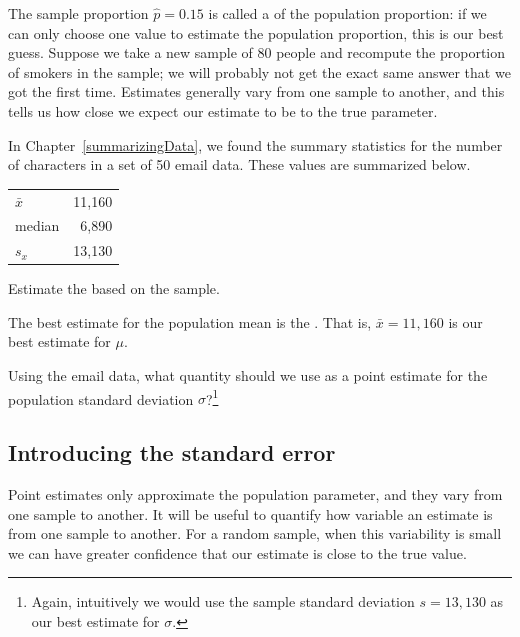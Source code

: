 The sample proportion $\hat{p} = 0.15$ is called a  of the population proportion: if we can only choose one value to estimate the population proportion, this is our best guess. Suppose we take a new sample of 80 people and recompute the proportion of smokers in the sample; we will probably not get the exact same answer that we got the first time. Estimates generally vary from one sample to another, and this  tells us how close we expect our estimate to be to the true parameter.

\begin{example}{
In Chapter~\ref{summarizingData}, we found the summary statistics for the number of characters in a set of 50 email data. These values are summarized below.

\begin{tabular}{l r }
$\bar{x}$ & 11,160 \\
median & 6,890 \\
$s_x$ & 13,130
\end{tabular}

Estimate the  based on the sample.}The best estimate for the population mean is the . That is,
$\bar{x} = 11,160$ is our best estimate for $\mu$.
\end{example}

\begin{exercise}Using the email data, what quantity should we use as a point estimate for the population standard deviation $\sigma$?\footnote{Again, intuitively we would use the sample standard deviation $s = 13,130$ as our best estimate for $\sigma$.}
\end{exercise}

%

\subsection{Introducing the standard error}

Point estimates only approximate the population parameter, and they vary from one sample to another. It will be useful to quantify how variable an estimate is from one sample to another. For a random sample, when this variability is small we can have greater confidence that our estimate is close to the true value.

